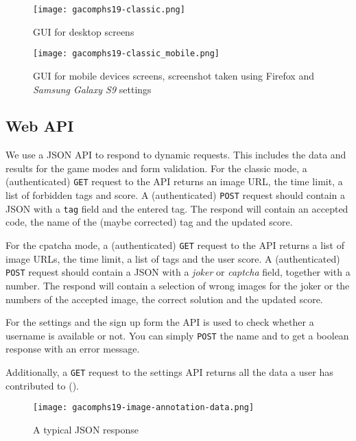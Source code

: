 \begin{figure}[!]
\centering
\texttt{[image: gacomphs19-classic.png]}
\caption{GUI for desktop screens}
\label{gacomphs19:fig:guiclassicdesktop}
\end{figure}


\begin{figure}[!]
\centering
\texttt{[image: gacomphs19-classic\_mobile.png]}
\caption{GUI for mobile devices screens, screenshot taken using Firefox and \textit{Samsung Galaxy S9} settings}
\label{gacomphs19:fig:guiclassicmobile}
\end{figure}


\subsection{Web API}
\label{gacomphs19:sec:implementation:API}
We use a JSON API to respond to dynamic requests. This includes the data and results for the game modes and form validation.
For the classic mode, a (authenticated) \texttt{GET} request to the API returns an image URL, the time limit, a list of forbidden tags and score.
A (authenticated) \texttt{POST} request should contain a JSON with a \texttt{tag} field and the entered tag. The respond will contain an accepted code, the name of the (maybe corrected) tag and the updated score.

For the cpatcha mode, a (authenticated) \texttt{GET} request to the API returns a list of image URLs, the time limit, a list of tags and the user score.
A (authenticated) \texttt{POST} request should contain a JSON with a \textit{joker} or \textit{captcha} field, together with a number. The respond will contain a selection of wrong images for the joker or the numbers of the accepted image, the correct solution and the updated score.

For the settings and the sign up form the API is used to check whether a username is available or not. You can simply \texttt{POST} the name and to get a boolean response with an error message.

Additionally, a \texttt{GET} request to the settings API returns all the data a user has contributed to ().

\begin{figure}[!]
\centering
\texttt{[image: gacomphs19-image-annotation-data.png]}
\caption{A typical JSON response}
\label{gacomphs19:fig:webapi}
\end{figure}
